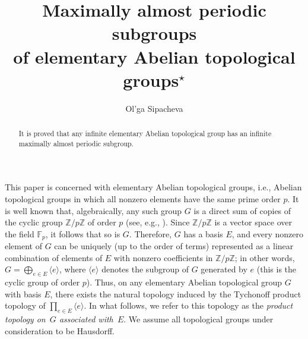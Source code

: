 \documentclass[12pt,a4paper]{amsart}
\theoremstyle{definition}
\begin{document}
{
\renewcommand*{\thefootnote}{$\star$}

\title[Maximally almost periodic subgroups]{Maximally almost periodic 
subgroups\\ of elementary Abelian topological groups$^\star$}  

}

\author{Ol'ga Sipacheva}


\address{Department of General Topology and Geometry, Faculty of Mechanics and  Mathematics, 
M.~V.~Lomonosov Moscow State University, Leninskie Gory 1, Moscow, 199991 Russia}

\begin{abstract}
It is proved that any infinite elementary Abelian topological group has an infinite maximally almost 
periodic subgroup. 
\end{abstract}



\maketitle

This paper is concerned with elementary Abelian topological groups, i.e., Abelian topological groups in which all 
nonzero elements have the same prime order $p$. It is well known that, algebraically, any such group $G$ is a direct sum of copies of the cyclic 
group $\mathbb Z/p\mathbb Z$ of order $p$ (see, e.g., \cite[Theorem~8.5]{Fuchs}). Since $\mathbb Z/p\mathbb Z$ is 
a vector space over the field $\mathbb F_p$, it follows that so is $G$. Therefore, $G$ has a basis $E$, and every 
nonzero element of $G$ can be uniquely (up to the order of terms) represented as a linear combination of elements 
of $E$ with nonzero coefficients in $\mathbb Z/p\mathbb Z$; in other words, $G = \bigoplus_{e\in E}\langle 
e\rangle$, where $\langle e\rangle$ denotes the subgroup of $G$ generated by $e$ (this is the cyclic group of 
order $p$). Thus, on any elementary Abelian topological group $G$ with basis $E$, there exists the 
natural topology induced by the Tychonoff product topology of $\prod_{e\in E}\langle e\rangle$. In what follows, 
we refer to this topology as the \emph{product topology on~$G$ associated with~$E$}. We assume all topological 
groups under consideration to be Hausdorff. 
\end{document}
